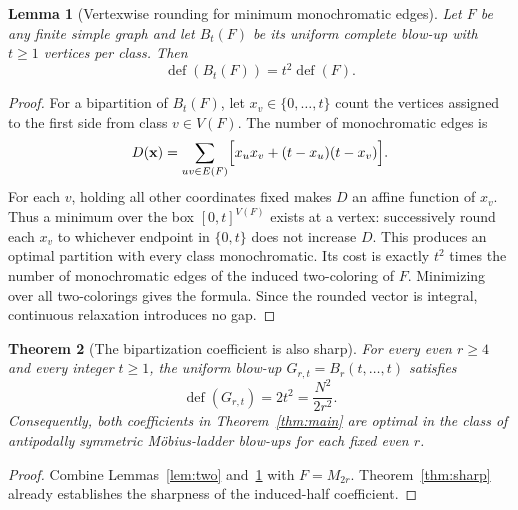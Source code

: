 \documentclass[11pt,a4paper]{article}
\newtheorem{theorem}{Theorem}[section]
\newtheorem{lemma}[theorem]{Lemma}
\newcommand{\defect}{\operatorname{def}}
\begin{document}
\begin{lemma}[Vertexwise rounding for minimum monochromatic edges]\label{lem:cutround}
Let $F$ be any finite simple graph and let $B_t(F)$ be its uniform complete blow-up with $t\ge1$ vertices per class. Then
\[
  \defect(B_t(F))=t^2\defect(F).
\]
\end{lemma}
\begin{proof}
For a bipartition of $B_t(F)$, let $x_v\in\{0,\ldots,t\}$ count the vertices assigned to the first side from class $v\in V(F)$. The number of monochromatic edges is
\[
 D(\mathbf x)=\sum_{uv\in E(F)}\Bigl[x_ux_v+(t-x_u)(t-x_v)\Bigr].
\]
For each $v$, holding all other coordinates fixed makes $D$ an affine function of $x_v$. Thus a minimum over the box $[0,t]^{V(F)}$ exists at a vertex: successively round each $x_v$ to whichever endpoint in $\{0,t\}$ does not increase $D$. This produces an optimal partition with every class monochromatic. Its cost is exactly $t^2$ times the number of monochromatic edges of the induced two-coloring of $F$. Minimizing over all two-colorings gives the formula. Since the rounded vector is integral, continuous relaxation introduces no gap.
\end{proof}

\begin{theorem}[The bipartization coefficient is also sharp]\label{thm:cutsharp}
For every even $r\ge4$ and every integer $t\ge1$, the uniform blow-up $G_{r,t}=B_r(t,\ldots,t)$ satisfies
\begin{equation}\label{eq:cutsharp}
\boxed{\defect(G_{r,t})=2t^2=\frac{N^2}{2r^2}.}
\end{equation}
Consequently, \emph{both} coefficients in Theorem~\ref{thm:main} are optimal in the class of antipodally symmetric M\"obius-ladder blow-ups for each fixed even $r$.
\end{theorem}
\begin{proof}
Combine Lemmas~\ref{lem:two} and~\ref{lem:cutround} with $F=M_{2r}$. Theorem~\ref{thm:sharp} already establishes the sharpness of the induced-half coefficient.
\end{proof}
\end{document}
